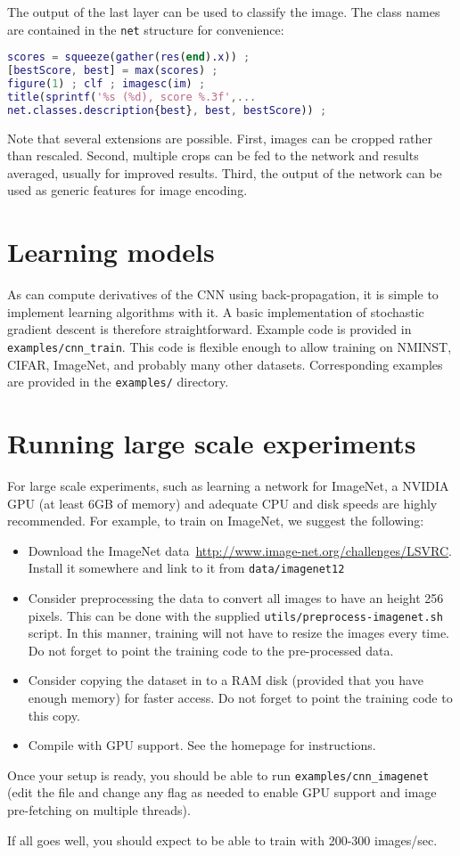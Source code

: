 The output of the last layer can be used to classify the image. The class names are contained in the \verb!net! structure for convenience:
\begin{lstlisting}[language=Matlab]
% show the classification result
scores = squeeze(gather(res(end).x)) ;
[bestScore, best] = max(scores) ;
figure(1) ; clf ; imagesc(im) ;
title(sprintf('%s (%d), score %.3f',...
net.classes.description{best}, best, bestScore)) ;
\end{lstlisting}

Note that several extensions are possible. First, images can be cropped rather than rescaled. Second, multiple crops can be fed to the network and results averaged, usually for improved results. Third, the output of the network can be used as generic features for image encoding.

\section{Learning models}

As \matconvnet can compute derivatives of the CNN using back-propagation, it is simple to implement learning algorithms with it. A basic implementation of stochastic gradient descent is therefore straightforward. Example code is provided in \verb!examples/cnn_train!. This code is flexible enough to allow training on NMINST, CIFAR, ImageNet, and probably many other datasets. Corresponding examples are provided in the \verb!examples/! directory.

\section{Running large scale experiments}

For large scale experiments, such as learning a network for ImageNet, a NVIDIA GPU (at least 6GB of memory) and adequate CPU and disk speeds are highly recommended. For example, to train on ImageNet, we suggest the following:
\begin{itemize}
\item Download the ImageNet data~\url{http://www.image-net.org/challenges/LSVRC}. Install it somewhere and link to it from \verb!data/imagenet12!
\item Consider preprocessing the data to convert all images to have an height 256 pixels. This can be done with the supplied \verb!utils/preprocess-imagenet.sh! script. In this manner, training will not have to resize the images every time. Do not forget to point the training code to the pre-processed data.
\item Consider copying the dataset in to a RAM disk (provided that you have enough memory) for faster access. Do not forget to point the training code to this copy.
\item Compile \matconvnet with GPU support. See the homepage for instructions.
\end{itemize}

Once your setup is ready, you should be able to run \verb!examples/cnn_imagenet! (edit the file and change any flag as needed to enable GPU support and image pre-fetching on multiple threads).

If all goes well, you should expect to be able to train with 200-300 images/sec.